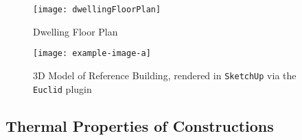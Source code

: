 \begin{figure}[htb]
    \centering
    \texttt{[image: dwellingFloorPlan]}
    \caption{Dwelling Floor Plan}
    \label{fig:floorplan}
\end{figure}

\begin{figure}[htb]
    \centering
    \texttt{[image: example-image-a]}
    \caption[3D Model of Reference Building]{3D Model of Reference Building, rendered in \texttt{SketchUp} via the \texttt{Euclid} plugin}
    \label{fig:3dmodel}
\end{figure}


\subsection{Thermal Properties of Constructions}

